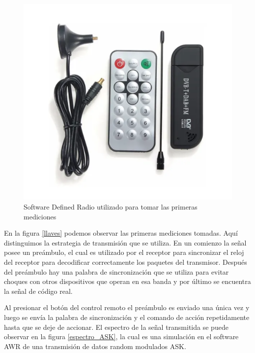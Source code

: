 \begin{figure}[htb]
	\centering
	\includegraphics[scale=0.4]{images/sdr.png}
	\caption{Software Defined Radio utilizado para tomar las primeras mediciones}
	\label{SDR}
\end{figure}

En la figura \ref{llaves} podemos observar las primeras mediciones tomadas. Aquí distinguimos la estrategia de transmisión que se
utiliza. En un comienzo la señal posee un preámbulo, el cual es utilizado por el receptor para sincronizar el reloj del receptor  para 
decodificar correctamente los paquetes del transmisor. Después del preámbulo hay una palabra de sincronización que se utiliza para evitar 
choques con otros dispositivos que operan en esa banda y por último se encuentra la señal de código real.\par
Al presionar el botón del control remoto el preámbulo es enviado una única vez y luego se envía la palabra de sincronización y el
comando de acción repetidamente hasta que se deje de accionar. El espectro de la señal transmitida se puede observar en la figura \ref{espectro_ASK},
la cual es una simulación en el software AWR de una transmisión de datos random modulados ASK.

